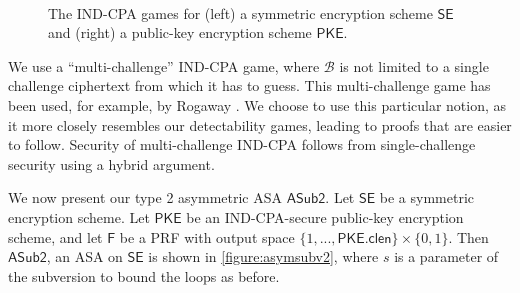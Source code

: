 \begin{figure}
\centering
\begin{pchstack}
\vrule\
\end{pchstack}
\caption[The IND-CPA games for a symmetric encryption scheme $\mathsf{SE}$ and a public-key encryption scheme $\mathsf{PKE}$]{The IND-CPA games for (left) a symmetric encryption scheme $\mathsf{SE}$ and (right) a public-key encryption scheme $\mathsf{PKE}$.}
\label{game:indse}
\label{game:indpke}
\end{figure}

We use a ``multi-challenge'' IND-CPA game, where $\mathcal{B}$ is not limited to a single challenge ciphertext from which it has to guess. This multi-challenge game has been used, for example, by Rogaway \cite{FSE:Rogaway04}. We choose to use this particular notion, as it more closely resembles our detectability games, leading to proofs that are easier to follow. Security of multi-challenge IND-CPA follows from single-challenge security using a hybrid argument.

We now present our type 2 asymmetric ASA $\mathsf{ASub2}$. Let $\mathsf{SE}$ be a symmetric encryption scheme. Let $\mathsf{PKE}$ be an IND-CPA-secure public-key encryption scheme, and let $\mathsf{F}$ be a PRF with output space $\{1,...,\mathsf{PKE.clen}\}\times \{0,1\}$. Then $\mathsf{ASub2}$, an ASA on $\mathsf{SE}$ is shown in \autoref{figure:asymsubv2}, where $s$ is a parameter of the subversion to bound the loops as before.

